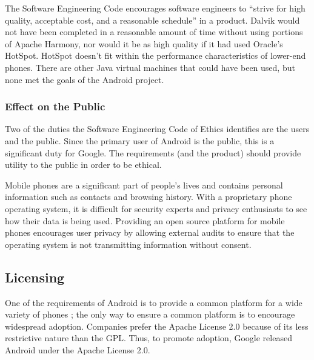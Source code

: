 \documentclass[11pt]{article}
\begin{document}
\begin{multicols}{2}
The Software Engineering Code \cite{secode} encourages software engineers to
``strive for high quality, acceptable cost, and a reasonable schedule'' in a
product.  Dalvik would not have been completed in a reasonable amount of time
without using portions of Apache Harmony, nor would it be as high quality if it
had used Oracle's HotSpot.  HotSpot doesn't fit within the performance
characteristics of lower-end phones. \cite{dalvik-vm-arch} There are other Java
virtual machines that could have been used, but none met the goals of the
Android project.


\subsubsection{Effect on the Public} %
\label{ssub:public-effect}

Two of the duties the Software Engineering Code of Ethics identifies are the
users and the public.  Since the primary user of Android is the public, this is
a significant duty for Google.  The requirements (and the product) should
provide utility to the public in order to be ethical.

Mobile phones are a significant part of people's lives and contains personal
information such as contacts and browsing history.  With a proprietary phone
operating system, it is difficult for security experts and privacy enthusiasts
to see how their data is being used.  Providing an open source platform for
mobile phones encourages user privacy by allowing external audits to ensure that
the operating system is not transmitting information without consent.



\subsection{Licensing} %
\label{sub:licensing}

One of the requirements of Android is to provide a common platform for a wide
variety of phones \cite{open-handset-alliance-ann}; the only way to ensure a
common platform is to encourage widespread adoption.  Companies prefer the
Apache License 2.0 because of its less restrictive nature than the GPL.
\cite{why-apache2-license}  Thus, to promote adoption, Google released Android
under the Apache License 2.0.


\end{multicols}
\end{document}
